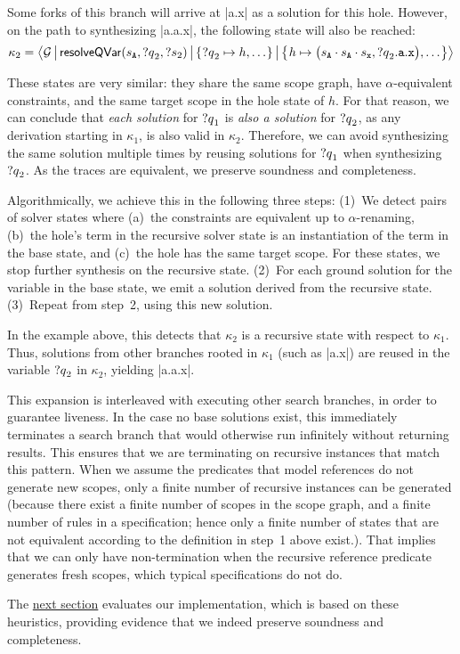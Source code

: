 \noindent
Some forks of this branch will arrive at \Java|a.x| as a solution for this hole.
However, on the path to synthesizing \Java|a.a.x|, the following state will also be reached:
\[
  \kappa_2 = \left\langle
    \mathcal{G}
  \mkern3mu \middle| \mkern3mu
    \mathsf{resolveQVar}(s_{\texttt{A}}, \text{?$q$}_2, \text{?$s$}_2)
  \mkern3mu \middle| \mkern3mu
    \left\{\mkern1mu  \text{?$q$}_2 \mapsto h, \ldots  \mkern1mu\right\}
  \mkern3mu \middle| \mkern3mu
    \left\{\mkern1mu  h \mapsto \big(s_{\texttt{A}} \cdot s_{\texttt{A}} \cdot s_{\texttt{x}}, \text{?$q$}_2.\texttt{a}.\texttt{x}\big), \ldots  \mkern1mu\right\}
  \right\rangle
\]

\noindent
These states are very similar: they share the same scope graph, have $\alpha$-equivalent constraints, and the same target scope in the hole state of $h$.
For that reason, we can conclude that \emph{each solution} for $\text{?$q$}_1$ is \emph{also a solution} for $\text{?$q$}_2$, as any derivation starting in $\kappa_1$, is also valid in $\kappa_2$.
Therefore, we can avoid synthesizing the same solution multiple times by reusing solutions for $\text{?$q$}_1$ when synthesizing $\text{?$q$}_2$.
As the traces are equivalent, we preserve soundness and completeness.

Algorithmically, we achieve this in the following three steps:
(1)~We detect pairs of solver states where
    (a)~the constraints are equivalent up to $\alpha$-renaming,
    (b)~the hole's term in the recursive solver state is an instantiation of the term in the base state, and
    (c)~the hole has the same target scope.
  For these states, we stop further synthesis on the recursive state.
(2)~For each ground solution for the variable in the base state, we emit a solution derived from the recursive state.
(3)~Repeat from step~2, using this new solution.

In the example above, this detects that $\kappa_2$ is a recursive state with respect to $\kappa_1$.
Thus, solutions from other branches rooted in $\kappa_1$ (such as \Java|a.x|) are reused in the variable $\text{?$q$}_2$ in $\kappa_2$, yielding \Java|a.a.x|.

This expansion is interleaved with executing other search branches, in order to guarantee liveness.
In the case no base solutions exist, this immediately terminates a search branch that would otherwise run infinitely without returning results.
This ensures that we are terminating on recursive instances that match this pattern.
When we assume the predicates that model references do not generate new scopes, only a finite number of recursive instances can be generated (because there exist a finite number of scopes in the scope graph, and a finite number of rules in a specification; hence only a finite number of states that are not equivalent according to the definition in step~1 above exist.).
That implies that we can only have non-termination when the recursive reference predicate generates fresh scopes, which typical specifications do not do.

The \hyperref[sec:evaluation]{next section} evaluates our implementation, which is based on these heuristics, providing evidence that we indeed preserve soundness and completeness.
